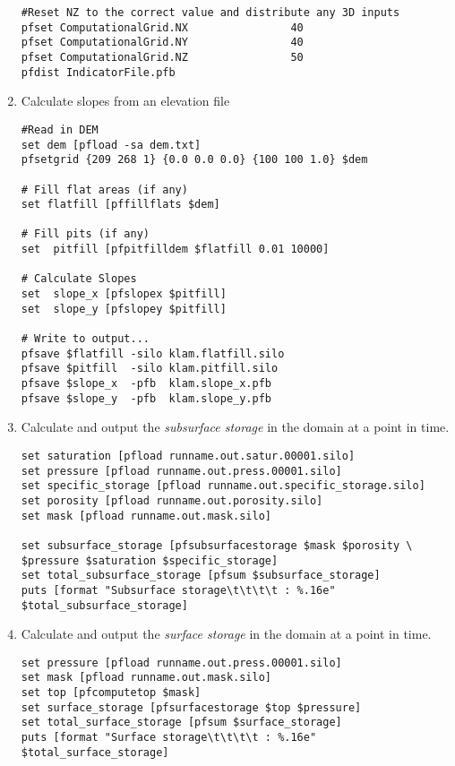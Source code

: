 \begin{enumerate}
\begin{display}
\begin{verbatim}
#Reset NZ to the correct value and distribute any 3D inputs
pfset ComputationalGrid.NX                40 
pfset ComputationalGrid.NY                40 
pfset ComputationalGrid.NZ                50 
pfdist IndicatorFile.pfb

\end{verbatim}\end{display}

\item Calculate slopes from an elevation file
\begin{display}\begin{verbatim}
#Read in DEM
set dem [pfload -sa dem.txt]
pfsetgrid {209 268 1} {0.0 0.0 0.0} {100 100 1.0} $dem

# Fill flat areas (if any)
set flatfill [pffillflats $dem]

# Fill pits (if any)
set  pitfill [pfpitfilldem $flatfill 0.01 10000]

# Calculate Slopes
set  slope_x [pfslopex $pitfill]
set  slope_y [pfslopey $pitfill]

# Write to output...
pfsave $flatfill -silo klam.flatfill.silo
pfsave $pitfill  -silo klam.pitfill.silo
pfsave $slope_x  -pfb  klam.slope_x.pfb
pfsave $slope_y  -pfb  klam.slope_y.pfb
\end{verbatim}\end{display}

\item Calculate and output the \emph{subsurface storage} in the domain at a point in time.
\begin{display}\begin{verbatim}
set saturation [pfload runname.out.satur.00001.silo]
set pressure [pfload runname.out.press.00001.silo]
set specific_storage [pfload runname.out.specific_storage.silo]
set porosity [pfload runname.out.porosity.silo]
set mask [pfload runname.out.mask.silo]

set subsurface_storage [pfsubsurfacestorage $mask $porosity \
$pressure $saturation $specific_storage]
set total_subsurface_storage [pfsum $subsurface_storage]
puts [format "Subsurface storage\t\t\t\t : %.16e" $total_subsurface_storage]
\end{verbatim}\end{display}

\item Calculate and output the \emph{surface storage} in the domain at a point in time.
\begin{display}\begin{verbatim}
set pressure [pfload runname.out.press.00001.silo]
set mask [pfload runname.out.mask.silo]
set top [pfcomputetop $mask]
set surface_storage [pfsurfacestorage $top $pressure]
set total_surface_storage [pfsum $surface_storage]
puts [format "Surface storage\t\t\t\t : %.16e" $total_surface_storage]
\end{verbatim}\end{display}


\end{enumerate}
